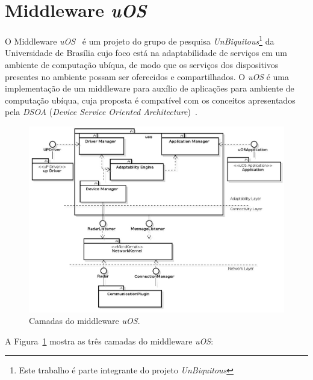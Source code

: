 \section{Middleware \textit{uOS}}
\label{uos}

	O Middleware \textit{uOS}~\cite{fabriciobuzzeto} é um projeto do grupo de pesquisa \textit{UnBiquitous}\footnote{Este trabalho é parte integrante do projeto \textit{UnBiquitous}} da Universidade de Brasília cujo foco está na adaptabilidade de serviços em um ambiente de computação ubíqua, de modo que os serviços dos dispositivos presentes no ambiente possam ser oferecidos e compartilhados. O \textit{uOS} é uma implementação de um middleware para auxílio de aplicações para ambiente de computação ubíqua, cuja proposta é compatível com os conceitos apresentados pela \textit{DSOA} (\textit{Device Service Oriented Architecture})~\cite{fabriciobuzzeto}. 

	 \begin{figure}[htb]
		\begin{center}
			\includegraphics[scale=0.45]{figuras/4.ProblemaEProposta/uoscamadas.jpg}
		\end{center}
		\caption{Camadas do middleware \textit{uOS}.}
		\label{fig:arq-uos}
	\end{figure}

	A Figura~\ref{fig:arq-uos} mostra as três camadas do middleware \textit{uOS}:

